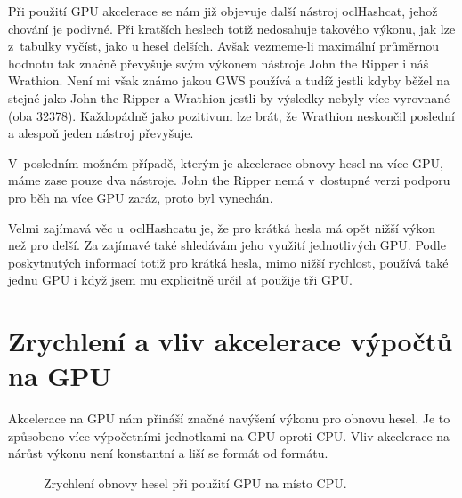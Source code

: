 Při použití GPU akcelerace se nám již objevuje další nástroj oclHashcat, jehož chování je
podivné. Při kratších heslech totiž nedosahuje takového výkonu, jak lze z~tabulky vyčíst, jako u 
hesel delších. Avšak vezmeme-li maximální průměrnou hodnotu tak značně převyšuje svým výkonem
nástroje John the Ripper i náš Wrathion. Není mi však známo jakou GWS používá a tudíž jestli
kdyby běžel na stejné jako John the Ripper a Wrathion jestli by výsledky nebyly více vyrovnané
(oba 32378). Každopádně jako pozitivum lze brát, že Wrathion neskončil poslední a alespoň jeden
nástroj převyšuje.

V~posledním možném případě, kterým je akcelerace obnovy hesel na více GPU, máme zase pouze dva
nástroje. John the Ripper nemá v~dostupné verzi podporu pro běh na více GPU zaráz, proto byl
vynechán. 

Velmi zajímavá věc u~oclHashcatu je, že pro krátká hesla má opět nižší výkon než pro delší. Za
zajímavé také shledávám jeho využití jednotlivých GPU. Podle poskytnutých informací totiž pro
krátká hesla, mimo nižší rychlost, používá také jednu GPU i když jsem mu explicitně určil ať
použije tři GPU.
\section{Zrychlení a vliv akcelerace výpočtů na GPU}
\label{sec:zrychlenit}
Akcelerace na GPU nám přináší značné navýšení výkonu pro obnovu hesel. Je to způsobeno více
výpočetními jednotkami na GPU oproti CPU. Vliv akcelerace na nárůst výkonu není konstantní a liší
se formát od formátu.
\begin{figure}[ht]
    \begin{center}
	\caption{Zrychlení obnovy hesel při použití GPU na místo CPU.}
	\label{memory}
    \end{center}
\end{figure}

